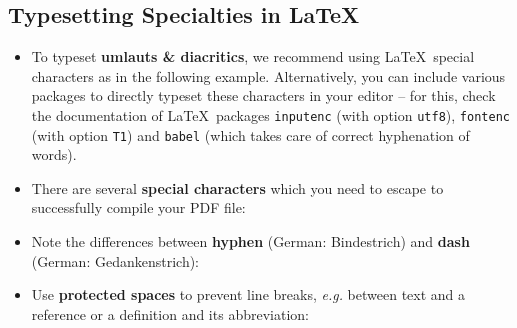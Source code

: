 \documentclass[11pt,a4paper]{article}
\begin{document}
\subsection{Typesetting Specialties in \LaTeX}
\label{sec-spec:tex}
\begin{itemize}
 \item To typeset \textbf{umlauts \& diacritics}, we recommend using \LaTeX~special characters as in the following example.
 Alternatively, you can include various packages to directly typeset these characters in your editor -- for this, check the documentation of \LaTeX~packages \texttt{inputenc} (with option \texttt{utf8}), \texttt{fontenc} (with option \texttt{T1}) and \texttt{babel} (which takes care of correct hyphenation of words).
 \vspace{-1em}
 \begin{texexample}
  
  
\end{texexample}

 \vspace{0.5cm}
 \item There are several \textbf{special characters} which you need to escape to successfully compile your PDF file:
 \vspace{-1em}
 \begin{texexample}
   
  
 \end{texexample}
 
 \item Note the differences between \textbf{hyphen} (German: Bindestrich) and \textbf{dash} (German: Gedankenstrich):
 \vspace{-1em}
 \begin{texexample}
   \begin{NoHyper}
     
  
    \end{NoHyper}
 \end{texexample}
 
 \item Use \textbf{protected spaces} to prevent line breaks, \emph{e.g.} between text and a reference or a definition and its abbreviation:


\end{itemize}
\end{document}
